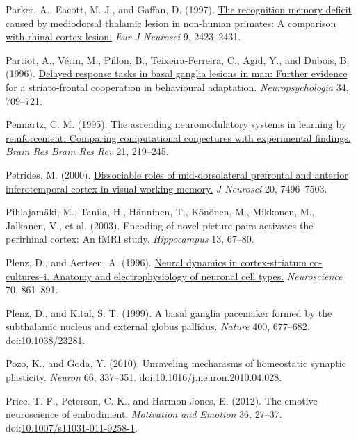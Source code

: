 \documentclass[
  11pt,
  a4paper,
]{scrbook}
\newlength{\cslhangindent}
\newenvironment{CSLReferences}[2] %
 {\begin{list}{}{%
  \setlength{\itemindent}{0pt}
  \setlength{\leftmargin}{0pt}
  \setlength{\parsep}{0pt}
  \ifodd #1
   \setlength{\leftmargin}{\cslhangindent}
   \setlength{\itemindent}{-1\cslhangindent}
  \fi
  \setlength{\itemsep}{#2\baselineskip}}}
 {\end{list}}
\begin{document}
\begin{CSLReferences}{1}{1}
Parker, A., Eacott, M. J., and Gaffan, D. (1997).
\href{https://www.ncbi.nlm.nih.gov/pubmed/9464936}{The recognition
memory deficit caused by mediodorsal thalamic lesion in non-human
primates: A comparison with rhinal cortex lesion.} \emph{Eur J Neurosci}
9, 2423--2431.

Partiot, A., Vérin, M., Pillon, B., Teixeira-Ferreira, C., Agid, Y., and
Dubois, B. (1996).
\href{https://www.ncbi.nlm.nih.gov/pubmed/8783222}{Delayed response
tasks in basal ganglia lesions in man: Further evidence for a
striato-frontal cooperation in behavioural adaptation.}
\emph{Neuropsychologia} 34, 709--721.

Pennartz, C. M. (1995).
\href{https://www.ncbi.nlm.nih.gov/pubmed/8806015}{The ascending
neuromodulatory systems in learning by reinforcement: Comparing
computational conjectures with experimental findings.} \emph{Brain Res
Brain Res Rev} 21, 219--245.

Petrides, M. (2000).
\href{https://www.ncbi.nlm.nih.gov/pubmed/11007909}{Dissociable roles of
mid-dorsolateral prefrontal and anterior inferotemporal cortex in visual
working memory.} \emph{J Neurosci} 20, 7496--7503.

Pihlajamäki, M., Tanila, H., Hänninen, T., Könönen, M., Mikkonen, M.,
Jalkanen, V., et al. (2003). Encoding of novel picture pairs activates
the perirhinal cortex: An {fMRI} study. \emph{Hippocampus} 13, 67--80.

Plenz, D., and Aertsen, A. (1996).
\href{https://www.ncbi.nlm.nih.gov/pubmed/8848172}{Neural dynamics in
cortex-striatum co-cultures--i. Anatomy and electrophysiology of
neuronal cell types.} \emph{Neuroscience} 70, 861--891.

Plenz, D., and Kital, S. T. (1999). A basal ganglia pacemaker formed by
the subthalamic nucleus and external globus pallidus. \emph{Nature} 400,
677--682. doi:\href{https://doi.org/10.1038/23281}{10.1038/23281}.

Pozo, K., and Goda, Y. (2010). Unraveling mechanisms of homeostatic
synaptic plasticity. \emph{Neuron} 66, 337--351.
doi:\href{https://doi.org/10.1016/j.neuron.2010.04.028}{10.1016/j.neuron.2010.04.028}.

Price, T. F., Peterson, C. K., and Harmon-Jones, E. (2012). The emotive
neuroscience of embodiment. \emph{Motivation and Emotion} 36, 27--37.
doi:\href{https://doi.org/10.1007/s11031-011-9258-1}{10.1007/s11031-011-9258-1}.


\end{CSLReferences}
\end{document}
